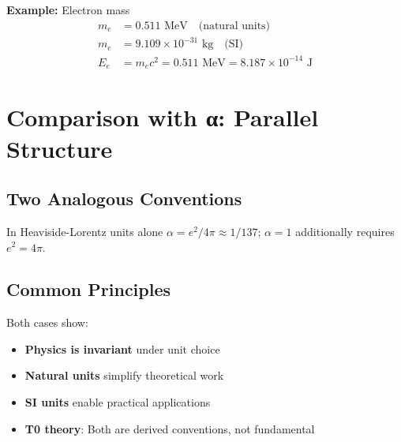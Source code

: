	\textbf{Example:} Electron mass
	\begin{align}
		m_e &= 0.511 \text{ MeV} \quad \text{(natural units)} \\
		m_e &= 9.109 \times 10^{-31} \text{ kg} \quad \text{(SI)} \\
		E_e &= m_e c^2 = 0.511 \text{ MeV} = 8.187 \times 10^{-14} \text{ J}
	\end{align}
	
	\section{Comparison with α: Parallel Structure}
	
	\subsection{Two Analogous Conventions}
	
	\begin{table}[h]
		\centering
		\caption{Parallel structure: α and c as conventions}
		{\footnotesize In Heaviside-Lorentz units alone $\alpha = e^2/4\pi \approx 1/137$; $\alpha = 1$ additionally requires $e^2 = 4\pi$.}
	\end{table}
	
	\subsection{Common Principles}
	
	Both cases show:
	\begin{itemize}
		\item \textbf{Physics is invariant} under unit choice
		\item \textbf{Natural units} simplify theoretical work
		\item \textbf{SI units} enable practical applications
		\item \textbf{T0 theory}: Both are derived conventions, not fundamental
	\end{itemize}
	
